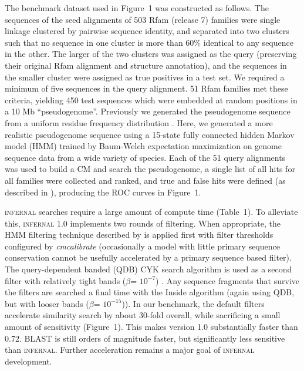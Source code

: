 The benchmark dataset used in Figure~1 
was constructed as follows. The sequences of the seed
alignments of 503 Rfam (release 7) families were single linkage
clustered by pairwise sequence identity, and separated into two
clusters such that no sequence in one cluster is more than 60\%
identical to any sequence in the other. The larger of the two clusters
was assigned as the query (preserving their original Rfam alignment
and structure annotation), and the sequences in the smaller cluster
were assigned as true positives in a test set. We required a minimum
of five sequences in the query alignment. 51 Rfam families met these
criteria, yielding 450 test sequences which were embedded at random
positions in a 10 Mb ``pseudogenome''.  Previously we generated the
pseudogenome sequence from a uniform residue frequency distribution \citep{NawrockiEddy07}.
Here, we generated a more realistic pseudogenome sequence using a
15-state fully connected hidden Markov model (HMM) trained by
Baum-Welch expectation maximization \citep{Durbin98} on genome
sequence data from a wide variety of species.  Each of the 51 query
alignments was used to build a CM and search the pseudogenome, a
single list of all hits for all families were collected and ranked,
and true and false hits were defined (as described in
\citet{NawrockiEddy07}), producing the ROC curves in Figure~1.

\textsc{infernal} searches require a large amount of compute time
(Table~1). To alleviate this, \textsc{infernal} 1.0 implements two
rounds of filtering.  When appropriate, the HMM filtering technique
described by \citet{WeinbergRuzzo06} is applied
first with filter thresholds configured by \emph{cmcalibrate}
(occasionally a model with little primary sequence conservation cannot
be usefully accelerated by a primary sequence based filter).  The
query-dependent banded (QDB) CYK search algorithm is used as a second
filter with relatively tight bands ($\beta$= $10^{-7}$)
\citep{NawrockiEddy07}.  Any sequence fragments that survive the filters are
searched a final time with the Inside algorithm (again using QDB, but with looser
bands ($\beta$= $10^{-15}$)).
In our benchmark, the default filters accelerate similarity search by
about 30-fold overall, while sacrificing a small amount of sensitivity
(Figure~1). This makes version 1.0 substantially faster than
0.72. \textsc{BLAST} is still orders of magnitude faster, but
significantly less sensitive than \textsc{infernal}. Further
acceleration remains a major goal of \textsc{infernal} development.


